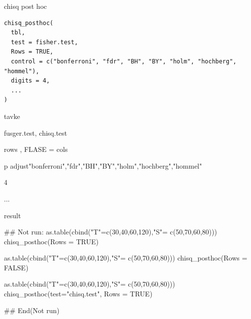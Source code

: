 \documentclass[a4paper]{book}
\begin{document}
%
\begin{Description}
chisq post hoc
\end{Description}
%
\begin{Usage}
\begin{verbatim}
chisq_posthoc(
  tbl,
  test = fisher.test,
  Rows = TRUE,
  control = c("bonferroni", "fdr", "BH", "BY", "holm", "hochberg", "hommel"),
  digits = 4,
  ...
)
\end{verbatim}
\end{Usage}
%
\begin{Arguments}
\begin{ldescription}
\item[\code{tbl}] tavke

\item[\code{test}] fusger.test, chisq.test

\item[\code{Rows}] rows , FLASE = cols

\item[\code{control}] p adjust"bonferroni","fdr","BH","BY","holm","hochberg","hommel"

\item[\code{digits}] 4

\item[\code{...}] ...
\end{ldescription}
\end{Arguments}
%
\begin{Value}
result
\end{Value}
%
\begin{Examples}
\begin{ExampleCode}

\#\# Not run: 
as.table(cbind("T"=c(30,40,60,120),"S"= c(50,70,60,80)))%
  chisq_posthoc(Rows  = TRUE)

as.table(cbind("T"=c(30,40,60,120),"S"= c(50,70,60,80)))%
  chisq_posthoc(Rows  = FALSE)

as.table(cbind("T"=c(30,40,60,120),"S"= c(50,70,60,80)))%
  chisq_posthoc(test="chisq.test", Rows  = TRUE)

## End(Not run)


\end{ExampleCode}
\end{Examples}
\end{document}
